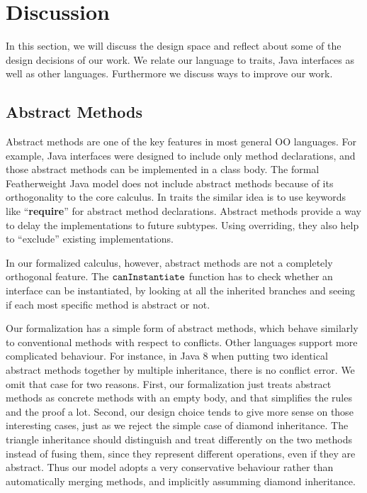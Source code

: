 \section{Discussion}\label{sec:discussion}
In this section, we will discuss the design space and reflect about some of the design decisions of our work. We relate 
our language to traits, Java interfaces as well as other languages. Furthermore we discuss
ways to improve our  work.

\subsection{Abstract Methods}

Abstract methods are one of the key features in most general OO languages. For example, Java interfaces were designed
to include only method declarations, and those abstract methods can be implemented in a class body. 
The formal Featherweight Java model does not include abstract methods because of its orthogonality to the core calculus. In traits the
similar idea is to use keywords like ``\textbf{require}'' for abstract method declarations. Abstract methods provide a way to
delay the implementations to future subtypes. Using overriding, they also help to ``exclude'' existing implementations.

In our formalized calculus, however, abstract methods are not a completely orthogonal feature. The $\texttt{canInstantiate}$ function
has to check whether an interface can be instantiated, by looking at all the inherited branches and seeing if each most specific method
is abstract or not.

Our formalization has a simple form of abstract methods, which behave similarly to conventional methods with respect to conflicts.
Other languages support more complicated behaviour.
For instance, in Java 8 when putting two identical abstract methods together by multiple inheritance, there is no conflict error. We omit
that case for two reasons. First, our formalization just treats abstract methods as concrete methods with an empty body, and that simplifies
the rules and the proof a lot. Second, our design choice tends to give more sense on those interesting cases, just as we reject the simple case of diamond inheritance. The triangle inheritance should distinguish and treat differently on the two methods instead of fusing them, since they represent different operations, even if they are abstract. Thus our model adopts a very conservative behaviour rather than automatically merging 
methods, and implicitly assumming diamond inheritance.

